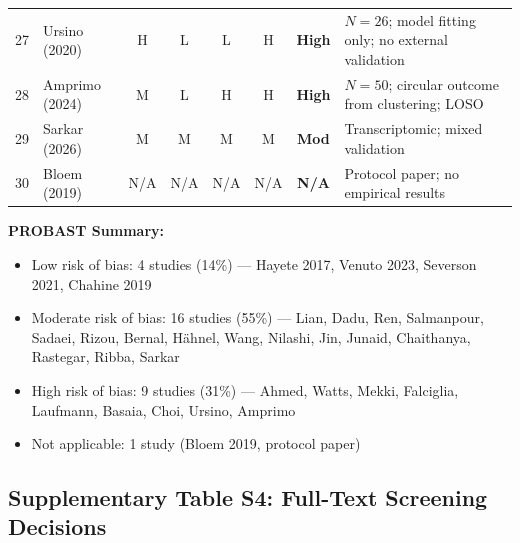 \documentclass[11pt,a4paper]{article}
\begin{document}
\begin{landscape}
\begin{small}
\begin{longtable}{@{}clcccccp{5.5cm}@{}}
27 & Ursino (2020)     & H & L & L & H & \textbf{High} & $N=26$; model fitting only; no external validation \\
28 & Amprimo (2024)    & M & L & H & H & \textbf{High} & $N=50$; circular outcome from clustering; LOSO \\
29 & Sarkar (2026)     & M & M & M & M & \textbf{Mod} & Transcriptomic; mixed validation \\
30 & Bloem (2019)      & N/A & N/A & N/A & N/A & \textbf{N/A} & Protocol paper; no empirical results \\
\end{longtable}
\end{small}

\vspace{0.5cm}
\noindent\textbf{PROBAST Summary:}
\begin{itemize}[leftmargin=*]
    \item Low risk of bias: 4 studies (14\%) --- Hayete 2017, Venuto 2023, Severson 2021, Chahine 2019
    \item Moderate risk of bias: 16 studies (55\%) --- Lian, Dadu, Ren, Salmanpour, Sadaei, Rizou, Bernal, H\"ahnel, Wang, Nilashi, Jin, Junaid, Chaithanya, Rastegar, Ribba, Sarkar
    \item High risk of bias: 9 studies (31\%) --- Ahmed, Watts, Mekki, Falciglia, Laufmann, Basaia, Choi, Ursino, Amprimo
    \item Not applicable: 1 study (Bloem 2019, protocol paper)
\end{itemize}
\end{landscape}

\clearpage
\subsection*{Supplementary Table S4: Full-Text Screening Decisions}
\end{document}
